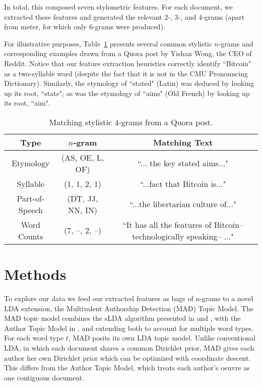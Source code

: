 \documentclass[14pt]{article} %
\theoremstyle{plain}
\theoremstyle{definition}
\theoremstyle{remark}
\begin{document}
In total, this composed seven stylometric features. For each document, we extracted these features and generated the relevant $2$-, $3$-, and $4$-grams (apart from meter, for which only $6$-grams were produced).

For illustrative purposes, Table~\ref{tab:sample_ngrams} presents several common stylistic $n$-grams and corresponding examples drawn from a Quora post by Yishan Wong, the CEO of Reddit. Notice that our feature extraction heuristics correctly identify ``Bitcoin" as a two-syllable word (despite the fact that it is not in the CMU Pronouncing Dictionary). Similarly, the etymology of ``stated" (Latin) was deduced by looking up its root, ``state"; as was the etymology of ``aims" (Old French) by looking up its root, ``aim".

\begin{table}[ht] 
\centering
\begin{tabular}{ c | c | c }
  Type & $n$-gram & Matching Text \\
  \hline
  Etymology & (AS, OE, L, OF) & ``... the key stated aims..." \\
  Syllable & (1, 1, 2, 1) & ``...fact that Bitcoin is..." \\
  Part-of-Speech & (DT, JJ, NN, IN) & ``...the libertarian culture of..." \\
  Word Counts & (7, --, 2, --) & ``It has all the features of Bitcoin--technologically speaking-- ..."
\end{tabular}
\caption{Matching stylistic $4$-grams from a Quora post.}
\label{tab:sample_ngrams}
\end{table}

\section{Methods}

To explore our data  we feed our extracted features as bags of n-grams to a novel LDA extension, the Multivalent Authorship Detection (MAD) Topic Model. The MAD topic model combines the sLDA algorithm presented in \cite{wang2009simultaneous} and \cite{Blei2007}, with the Author Topic Model in \cite{rosen2004author}, and extending both to account for multiple word types.  For each word type $t$, MAD posits its own LDA topic model. Unlike conventional LDA, in which each document shares a common Dirichlet prior, MAD gives each author her own Dirichlet prior which can be optimized with coordinate descent. This differs from the Author Topic Model, which treats each author's oeuvre as one contiguous document.
\end{document}
